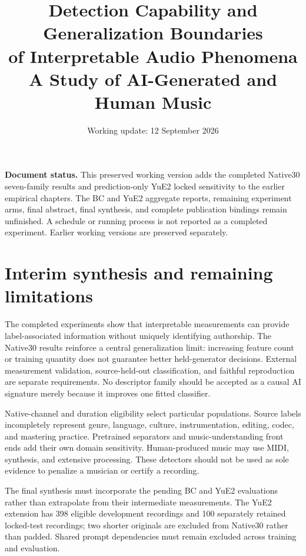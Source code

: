 \documentclass[11pt,a4paper]{article}
\title{Detection Capability and Generalization Boundaries\\of Interpretable Audio Phenomena\\
\large A Study of AI-Generated and Human Music}
\author{}
\date{Working update: 12 September 2026}
\begin{document}
\maketitle
\noindent\textbf{Document status.} This preserved working version adds the completed
Native30 seven-family results and prediction-only YuE2 locked sensitivity to
the earlier empirical chapters. The BC and YuE2 aggregate reports, remaining
experiment arms, final abstract, final synthesis, and complete publication bindings
remain unfinished. A schedule or running process is not reported as a completed
experiment. Earlier working versions are preserved separately.
\tableofcontents
\clearpage











\section{Interim synthesis and remaining limitations}
The completed experiments show that interpretable measurements can provide
label-associated information without uniquely identifying authorship. The
Native30 results reinforce a central generalization limit: increasing feature
count or training quantity does not guarantee better held-generator decisions.
External measurement validation, source-held-out classification, and faithful
reproduction are separate requirements. No descriptor family should be accepted
as a causal AI signature merely because it improves one fitted classifier.

Native-channel and duration eligibility select particular populations. Source
labels incompletely represent genre, language, culture, instrumentation, editing,
codec, and mastering practice. Pretrained separators and music-understanding
front ends add their own domain sensitivity. Human-produced music may use MIDI,
synthesis, and extensive processing. These detectors should not be used as sole
evidence to penalize a musician or certify a recording.

The final synthesis must incorporate the pending BC and YuE2 evaluations rather
than extrapolate from their intermediate measurements. The YuE2 extension has
398 eligible development recordings and 100 separately retained locked-test
recordings; two shorter originals are excluded from Native30 rather than padded.
Shared prompt dependencies must remain excluded across training and evaluation.



\end{document}
